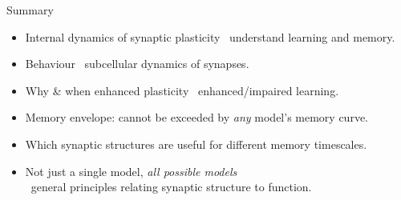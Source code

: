 \documentclass[final]{beamer}%
\begin{document}
%
%


\begin{frame}{Summary}
%
 \begin{itemize}
   \item Internal dynamics of synaptic plasticity \lto\ understand learning and memory.

   \vp\item Behaviour \lto\ subcellular dynamics of synapses.

   \vp\item Why \& when enhanced plasticity \lto\ enhanced/impaired learning.

   \vp\item Memory envelope: cannot be exceeded by \emph{any} model's memory curve.

   \vp\item Which synaptic structures are useful for different memory timescales.

   \vp\item Not just a single model, \emph{all possible models} \\
   \hfill\lto\ general principles relating synaptic structure to function.
 \end{itemize}
%
\end{frame}
\end{document}
